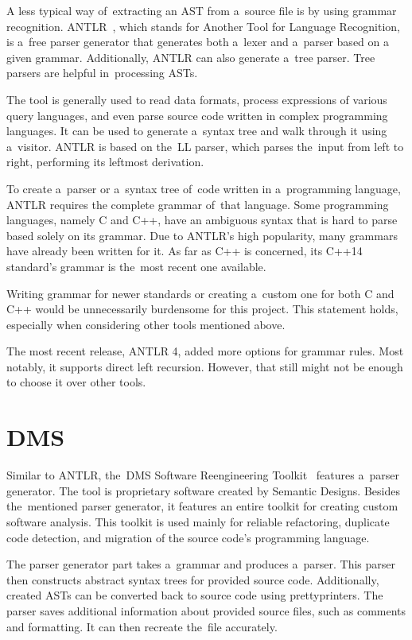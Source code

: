 A less typical way of~extracting an AST from a~source file is by using grammar
recognition.
ANTLR~\citep{antlr:online}, which stands for Another Tool for 
Language Recognition, is a~free 
parser generator that generates both a~lexer and a~parser based on 
a given grammar.
Additionally, ANTLR can also generate a~tree parser.
Tree parsers are helpful in~processing ASTs.

The tool is generally used to read data formats, process expressions 
of various query languages, and even parse source code written in complex 
programming languages.
It can be used to generate a~syntax tree and walk through it using a~visitor.
ANTLR is based on the~LL parser, which parses the~input from left to right, 
performing its leftmost derivation.

To create a~parser or a~syntax tree of~code written in a~programming language, 
ANTLR requires the complete grammar of~that language.
Some programming languages, namely C and C++, have an ambiguous syntax that 
is hard to parse based solely on its grammar.
Due to ANTLR's high popularity, many grammars have already been written 
for it.
As far as C++ is concerned, its C++14 standard's grammar is the~most recent 
one available.

Writing grammar for newer standards or creating a~custom one for both C and 
C++ would be unnecessarily burdensome for this project.
This statement holds, especially when considering other tools mentioned above.

The most recent release, ANTLR 4, added more options for grammar rules.
Most notably, it supports direct left recursion.
However, that still might not be enough to choose it over other tools.


\section{DMS}

Similar to ANTLR, the~DMS Software Reengineering Toolkit~\citep{dms:online}
features a~parser generator.
The tool is proprietary software created by Semantic Designs.
Besides the~mentioned parser generator, it features an entire toolkit for 
creating custom software analysis.
This toolkit is used mainly for reliable refactoring, duplicate code 
detection, and migration of the source code's programming language.

The parser generator part takes a~grammar and produces a~parser.
This parser then constructs abstract syntax trees for provided source code.
Additionally, created ASTs can be converted back to source code using 
prettyprinters.
The parser saves additional information about provided source files, such as 
comments and formatting.
It can then recreate the~file accurately.

